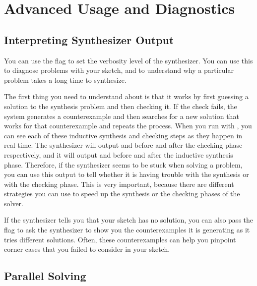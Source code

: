 \section{Advanced Usage and Diagnostics}


\subsection{Interpreting Synthesizer Output}
You can use the flag  to set the verbosity level of the synthesizer. You can use this to diagnose problems with your sketch, and to understand why a particular problem takes a long time to synthesize. 

The first thing you need to understand about \Sk{} is that it works by first guessing a solution to the synthesis problem and then checking it. If the check fails, the system generates a counterexample and then searches for a new solution that works for that counterexample and repeats the process. When you run with , you can see each of these inductive synthesis and checking steps as they happen in real time. The synthesizer will output  and  before and after the checking phase respectively, and it will output  and  before and after the inductive synthesis phase. Therefore, if the synthesizer seems to be stuck when solving a problem, you can use this output to tell whether it is having trouble with the synthesis or with the checking phase. This is very important, because there are different strategies you can use to speed up the synthesis or the checking phases of the solver. 

If the synthesizer tells you that your sketch has no solution, you can also pass the flag  to ask the synthesizer to show you the counterexamples it is generating as it tries different solutions. Often, these counterexamples can help you pinpoint corner cases that you failed to consider in your sketch. 




\subsection{Parallel Solving}


